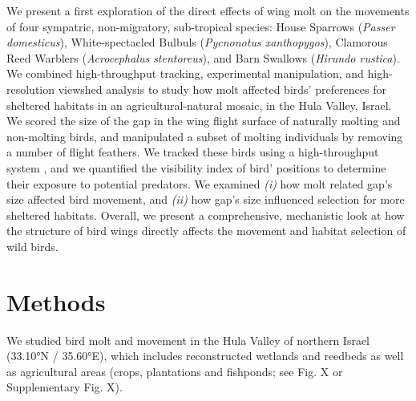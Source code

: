 \begin{refsection}
We present a first exploration of the direct effects of wing molt on the movements of four sympatric, non-migratory, sub-tropical species: House Sparrows (\textit{Passer domesticus}), White-spectacled Bulbuls (\textit{Pycnonotus xanthopygos}), Clamorous Reed Warblers (\textit{Acrocephalus stentoreus}), and Barn Swallows (\textit{Hirundo rustica}).
We combined high-throughput tracking, experimental manipulation, and high-resolution viewshed analysis to study how molt affected birds' preferences for sheltered habitats in an agricultural-natural mosaic, in the Hula Valley, Israel.
We scored the size of the gap in the wing flight surface \citep{lind2001,kiat2016} of naturally molting and non-molting birds, and manipulated a subset of molting individuals by removing a number of flight feathers.
We tracked these birds using a high-throughput system \citep{toledo2014,weiser2016,toledo2020}, and we quantified the visibility index of bird' positions to determine their exposure to potential predators.
We examined \textit{(i)} how molt related gap's size affected bird movement, and \textit{(ii)} how gap's size influenced selection for more sheltered habitats.
Overall, we present a comprehensive, mechanistic look at how the structure of bird wings directly affects the movement and habitat selection of wild birds.

\section*{Methods}

We studied bird molt and movement in the Hula Valley of northern Israel (33.10°N / 35.60°E), which includes reconstructed wetlands and reedbeds as well as agricultural areas (crops, plantations and fishponds; see Fig. X or Supplementary Fig. X).


\end{refsection}
